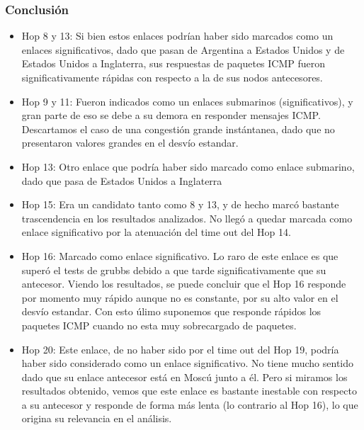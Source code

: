 \subsubsection{Conclusi\'on}
\begin{itemize}
\item Hop 8 y 13: Si bien estos enlaces podr\'ian haber sido marcados como un enlaces significativos, dado que pasan de Argentina a Estados Unidos y de Estados Unidos a Inglaterra, sus respuestas de paquetes ICMP fueron significativamente r\'apidas con respecto a la de sus nodos antecesores.
\item Hop 9 y 11: Fueron indicados como un enlaces submarinos (significativos), y gran parte de eso se debe a su demora en responder mensajes ICMP. Descartamos el caso de una congesti\'on grande inst\'antanea, dado que no presentaron valores grandes en el desv\'io estandar.
\item Hop 13: Otro enlace que podr\'ia haber sido marcado como enlace submarino, dado que pasa de Estados Unidos a Inglaterra
\item Hop 15: Era un candidato tanto como 8 y 13, y de hecho marc\'o bastante trascendencia en los resultados analizados. No lleg\'o a quedar marcada como enlace significativo por la atenuaci\'on del time out del Hop 14.
\item Hop 16: Marcado como enlace significativo. Lo raro de este enlace es que super\'o el tests de grubbs debido a que tarde significativamente que su antecesor. Viendo los resultados, se puede concluir que el Hop 16 responde por momento muy r\'apido aunque no es constante, por su alto valor en el desv\'io estandar. Con esto \'ulimo suponemos que responde r\'apidos los paquetes ICMP cuando no esta muy sobrecargado de paquetes.
\item Hop 20: Este enlace, de no haber sido por el time out del Hop 19, podr\'ia haber sido considerado como un enlace significativo. No tiene mucho sentido dado que su enlace antecesor est\'a en Mosc\'u junto a \'el. Pero si miramos los resultados obtenido, vemos que este enlace es bastante inestable con respecto a su antecesor y responde de forma m\'as lenta (lo contrario al Hop 16), lo que origina su relevancia en el an\'alisis.
\end{itemize}